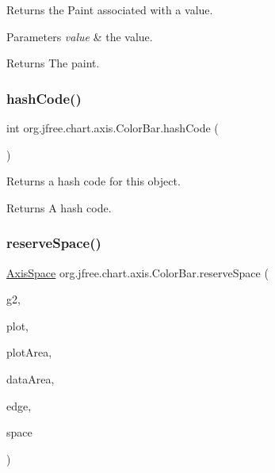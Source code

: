 Returns the Paint associated with a value.


\begin{DoxyParams}{Parameters}
{\em value} & the value.\\
\hline
\end{DoxyParams}
\begin{DoxyReturn}{Returns}
The paint. 
\end{DoxyReturn}
\mbox{\label{classorg_1_1jfree_1_1chart_1_1axis_1_1_color_bar_a5f5947b7df0df04cf6a3ef9f12ff4844}} 
\subsubsection{\texorpdfstring{hash\+Code()}{hashCode()}}
{\footnotesize\ttfamily int org.\+jfree.\+chart.\+axis.\+Color\+Bar.\+hash\+Code (\begin{DoxyParamCaption}{ }\end{DoxyParamCaption})}

Returns a hash code for this object.

\begin{DoxyReturn}{Returns}
A hash code. 
\end{DoxyReturn}
\mbox{\label{classorg_1_1jfree_1_1chart_1_1axis_1_1_color_bar_a623ac16b72c970cf5a52bc7194883e41}} 
\subsubsection{\texorpdfstring{reserve\+Space()}{reserveSpace()}}
{\footnotesize\ttfamily \mbox{\hyperlink{classorg_1_1jfree_1_1chart_1_1axis_1_1_axis_space}{Axis\+Space}} org.\+jfree.\+chart.\+axis.\+Color\+Bar.\+reserve\+Space (\begin{DoxyParamCaption}\item[{Graphics2D}]{g2,  }\item[{\mbox{\hyperlink{classorg_1_1jfree_1_1chart_1_1plot_1_1_plot}{Plot}}}]{plot,  }\item[{Rectangle2D}]{plot\+Area,  }\item[{Rectangle2D}]{data\+Area,  }\item[{Rectangle\+Edge}]{edge,  }\item[{\mbox{\hyperlink{classorg_1_1jfree_1_1chart_1_1axis_1_1_axis_space}{Axis\+Space}}}]{space }\end{DoxyParamCaption})}


